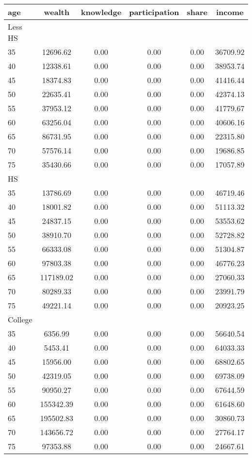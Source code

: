  \begin{tabular}{lccccc}
 \hline \hline
  age & wealth & knowledge & participation & share & income \\
 \hline
 Less HS & & & & & \\
 \hline
35 &  12696.62 &      0.00 &      0.00 &      0.00 &  36709.92 \\ 
40 &  12338.61 &      0.00 &      0.00 &      0.00 &  38953.74 \\ 
45 &  18374.83 &      0.00 &      0.00 &      0.00 &  41416.44 \\ 
50 &  22635.41 &      0.00 &      0.00 &      0.00 &  42374.13 \\ 
55 &  37953.12 &      0.00 &      0.00 &      0.00 &  41779.67 \\ 
60 &  63256.04 &      0.00 &      0.00 &      0.00 &  40606.16 \\ 
65 &  86731.95 &      0.00 &      0.00 &      0.00 &  22315.80 \\ 
70 &  57576.14 &      0.00 &      0.00 &      0.00 &  19686.85 \\ 
75 &  35430.66 &      0.00 &      0.00 &      0.00 &  17057.89 \\ 
 \hline
 HS & & & & & \\
 \hline
35 &  13786.69 &      0.00 &      0.00 &      0.00 &  46719.46 \\ 
40 &  18001.82 &      0.00 &      0.00 &      0.00 &  51113.32 \\ 
45 &  24837.15 &      0.00 &      0.00 &      0.00 &  53553.62 \\ 
50 &  38910.70 &      0.00 &      0.00 &      0.00 &  52728.82 \\ 
55 &  66333.08 &      0.00 &      0.00 &      0.00 &  51304.87 \\ 
60 &  97803.38 &      0.00 &      0.00 &      0.00 &  46776.23 \\ 
65 & 117189.02 &      0.00 &      0.00 &      0.00 &  27060.33 \\ 
70 &  80289.33 &      0.00 &      0.00 &      0.00 &  23991.79 \\ 
75 &  49221.14 &      0.00 &      0.00 &      0.00 &  20923.25 \\ 
 \hline
 College & & & & & \\
 \hline
35 &   6356.99 &      0.00 &      0.00 &      0.00 &  56640.54 \\ 
40 &   5453.41 &      0.00 &      0.00 &      0.00 &  64033.33 \\ 
45 &  15956.00 &      0.00 &      0.00 &      0.00 &  68802.65 \\ 
50 &  42319.05 &      0.00 &      0.00 &      0.00 &  69738.09 \\ 
55 &  90950.27 &      0.00 &      0.00 &      0.00 &  67644.59 \\ 
60 & 155342.39 &      0.00 &      0.00 &      0.00 &  61648.60 \\ 
65 & 195502.83 &      0.00 &      0.00 &      0.00 &  30860.73 \\ 
70 & 143656.72 &      0.00 &      0.00 &      0.00 &  27764.17 \\ 
75 &  97353.88 &      0.00 &      0.00 &      0.00 &  24667.61 \\ 
 \hline \hline
 \end{tabular}
